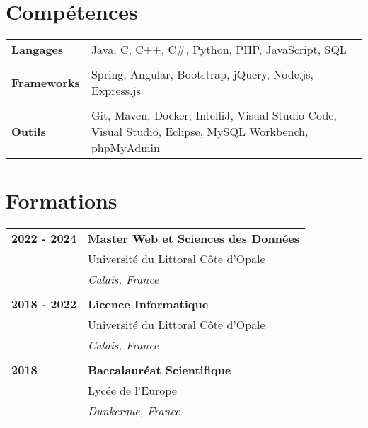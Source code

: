 \documentclass[a4paper, 12pt]{article}
\begin{document}
\begin{minipage}[t]{0.65\textwidth}

    \section*{\textcolor{sectioncolor}{Compétences}}
    \begin{tabular}{ m{} m{} }
        \textbf{Langages} & Java, C, C++, C\#, Python, PHP, JavaScript, SQL \\
        & \\
        \textbf{Frameworks} & Spring, Angular, Bootstrap, jQuery, Node.js, Express.js \\
        & \\
        \textbf{Outils} & Git, Maven, Docker, IntelliJ, Visual Studio Code, Visual Studio, Eclipse, MySQL Workbench, phpMyAdmin \\
    \end{tabular}

    \section*{\textcolor{sectioncolor}{Formations}}
    \begin{tabular}{ m{} m{} }
        \textbf{2022 - 2024} & \textbf{Master Web et Sciences des Données} \\
        & Université du Littoral Côte d'Opale \\
        & \textit{Calais, France} \\
        & \\
        \textbf{2018 - 2022} & \textbf{Licence Informatique} \\
        & Université du Littoral Côte d'Opale \\
        & \textit{Calais, France} \\
        & \\
        \textbf{2018} & \textbf{Baccalauréat Scientifique} \\
        & Lycée de l'Europe \\
        & \textit{Dunkerque, France} \\
    \end{tabular}


\end{minipage}
\end{document}
